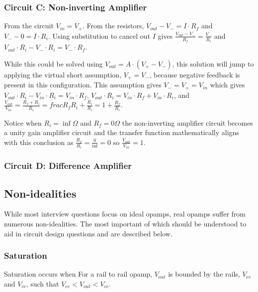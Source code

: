 \documentclass[main.tex]{subfiles}
\begin{document}
\subsubsection{Circuit C: Non-inverting Amplifier}
From the circuit $V_{in} = V_{+}$. From the resistors, $V_{out} - V_{-} = I \cdot R_f$ and $V_{-} - 0 = I \cdot R_i$. Using substitution to cancel out $I$ gives $\frac{V_{out} - V_{-}}{R_f} = \frac{V_{-}}{R_i}$ and $V_{out} \cdot R_i - V_{-} \cdot R_i = V_{-} \cdot R_f$.

While this could be solved using $V_{out} = A \cdot (V_{+} - V_{-})$, this solution will jump to applying the virtual short assumption, $V_{+} = V_{-}$, because negative feedback is present in this configuration. This assumption gives $V_{-} = V_{+} = V_{in}$ which gives $V_{out} \cdot R_i - V_{in} \cdot R_i = V_{in} \cdot R_f$, $V_{out} \cdot R_i = V_{in} \cdot R_f + V_{in} \cdot R_i$, and $\frac{V_{out}}{V_{in}} = \frac{R_f + R_i}{R_i} = frac{R_f}{R_i} + \frac{R_i}{R_i} = 1 + \frac{R_f}{R_i}$. 

Notice when $R_i = \inf \Omega$ and $R_f = 0 \Omega$ the non-inverting amplifier circuit becomes a unity gain amplifier circuit and the transfer function mathematically aligns with this conclusion as $\frac{R_f}{R_i} = \frac{0}{\inf} = 0$ so $\frac{V_{out}}{V_{in}} = 1$. 

\subsubsection{Circuit D: Difference Amplifier}


\subsection{Non-idealities}
While most interview questions focus on ideal opamps, real opamps suffer from numerous non-idealities. The most important of which should be understood to aid in circuit design questions and are described below. 

\subsubsection{Saturation}
Saturation occurs when 
For a rail to rail opamp, $V_{out}$ is bounded by the rails, $V_{ee}$ and $V_{cc}$, such that $V_{ee} < V_{out} < V_{cc}$. 
\end{document}
